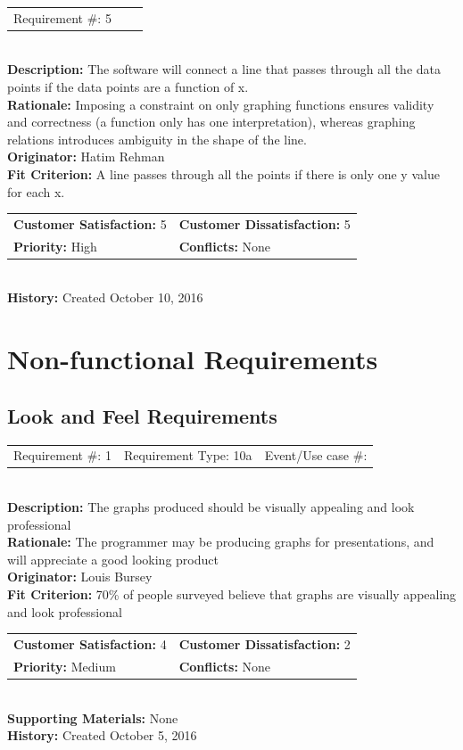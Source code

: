 \documentclass[12pt, titlepage]{article}
\begin{document}
\begin{reqbox}
\begin{tabular}{ccc}Requirement \#: 5
\end{tabular} \\
\textbf{Description:} The software will connect a line that passes through all the data points if the data points are a function of x.\\
\textbf{Rationale:} Imposing a constraint on only graphing functions ensures validity and correctness (a function only has one interpretation), whereas graphing relations introduces ambiguity in the shape of the line. \\
\textbf{Originator:} Hatim Rehman \\
\textbf{Fit Criterion:} A line passes through all the points if there is only one y value for each x.\\
\begin{tabular}{ll}
\textbf{Customer Satisfaction:} 5 & \textbf{Customer Dissatisfaction:} 5 \\
\textbf{Priority:} High & \textbf{Conflicts:} None\\
\end{tabular} \\
\textbf{History:} Created October 10, 2016
\end{reqbox}
\clearpage

\section{Non-functional Requirements} %

\subsection{Look and Feel Requirements}
%
%
\begin{reqbox}
\begin{tabular}{ccc}
Requirement \#: 1& Requirement Type: 10a & Event/Use case \#: \\
\end{tabular} \\
\textbf{Description:} The graphs produced should be visually appealing and look professional \\
\textbf{Rationale:} The programmer may be producing graphs for presentations, and will appreciate a good looking product \\
\textbf{Originator:} Louis Bursey\\
\textbf{Fit Criterion:} 70\% of people surveyed believe that graphs are visually appealing and look professional  \\
\begin{tabular}{ll}
\textbf{Customer Satisfaction:} 4 & \textbf{Customer Dissatisfaction:} 2 \\
\textbf{Priority:} Medium & \textbf{Conflicts:} None\\
\end{tabular} \\
\textbf{Supporting Materials:} None \\
\textbf{History:} Created October 5, 2016
\end{reqbox}
%
%
\end{document}
